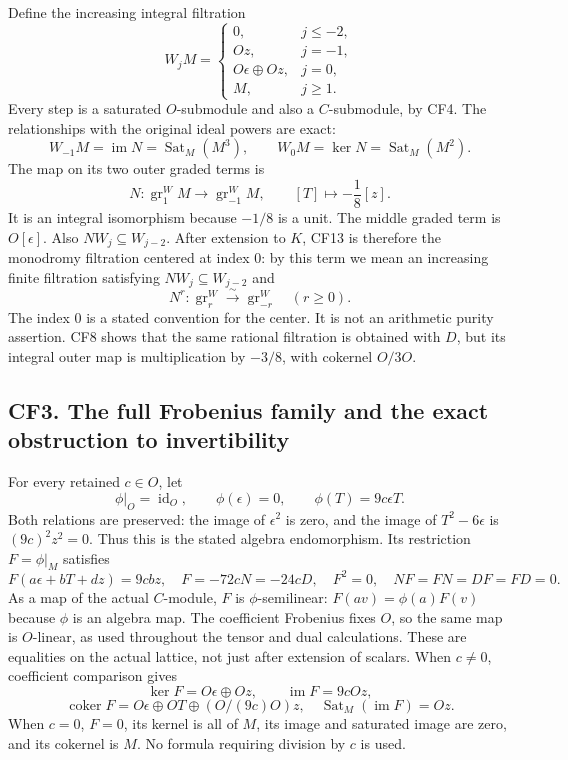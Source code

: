 \documentclass[
  10pt,
]{article}
\begin{document}
Define the increasing integral filtration \[
 W_jM=
 \begin{cases}
 0,&j\leq-2,\\
 Oz,&j=-1,\\
 O\epsilon\oplus Oz,&j=0,\\
 M,&j\geq1.
 \end{cases}
 \tag{CF13}
\] Every step is a saturated \(O\)-submodule and also a \(C\)-submodule,
by CF4. The relationships with the original ideal powers are exact: \[
 W_{-1}M=\operatorname{im}N=\operatorname{Sat}_M(M^3),
 \qquad W_0M=\ker N=\operatorname{Sat}_M(M^2).
 \tag{CF14}
\] The map on its two outer graded terms is \[
 N:\operatorname{gr}^W_1M\longrightarrow\operatorname{gr}^W_{-1}M,
 \qquad [T]\longmapsto-\frac18[z].
 \tag{CF15}
\] It is an integral isomorphism because \(-1/8\) is a unit. The middle
graded term is \(O[\epsilon]\). Also \(NW_j\subseteq W_{j-2}\). After
extension to \(K\), CF13 is therefore the monodromy filtration centered
at index \(0\): by this term we mean an increasing finite filtration
satisfying \(NW_j\subseteq W_{j-2}\) and \[
 N^r:\operatorname{gr}^W_r\xrightarrow{\sim}\operatorname{gr}^W_{-r}
 \quad(r\geq0).
 \tag{CF16}
\] The index \(0\) is a stated convention for the center. It is not an
arithmetic purity assertion. CF8 shows that the same rational filtration
is obtained with \(D\), but its integral outer map is multiplication by
\(-3/8\), with cokernel \(O/3O\).

\subsection{CF3. The full Frobenius family and the exact obstruction to
invertibility}\label{cf3.-the-full-frobenius-family-and-the-exact-obstruction-to-invertibility}

For every retained \(c\in O\), let \[
 \phi|_O=\operatorname{id}_O,\qquad
 \phi(\epsilon)=0,\qquad \phi(T)=9c\epsilon T.
 \tag{CF17}
\] Both relations are preserved: the image of \(\epsilon^2\) is zero,
and the image of \(T^2-6\epsilon\) is \((9c)^2z^2=0\). Thus this is the
stated algebra endomorphism. Its restriction \(F=\phi|_M\) satisfies \[
 F(a\epsilon+bT+dz)=9c b z,
 \quad F=-72cN=-24cD,
 \quad F^2=0,
 \quad NF=FN=DF=FD=0.
 \tag{CF18}
\] As a map of the actual \(C\)-module, \(F\) is \(\phi\)-semilinear:
\(F(av)=\phi(a)F(v)\) because \(\phi\) is an algebra map. The
coefficient Frobenius fixes \(O\), so the same map is \(O\)-linear, as
used throughout the tensor and dual calculations. These are equalities
on the actual lattice, not just after extension of scalars. When
\(c\neq0\), coefficient comparison gives \[
 \ker F=O\epsilon\oplus Oz,
 \qquad\operatorname{im}F=9cOz,
\] \[
 \operatorname{coker}F
 =O\epsilon\oplus OT\oplus (O/(9c)O)z,
 \quad\operatorname{Sat}_M(\operatorname{im}F)=Oz.
 \tag{CF19}
\] When \(c=0\), \(F=0\), its kernel is all of \(M\), its image and
saturated image are zero, and its cokernel is \(M\). No formula
requiring division by \(c\) is used.
\end{document}
